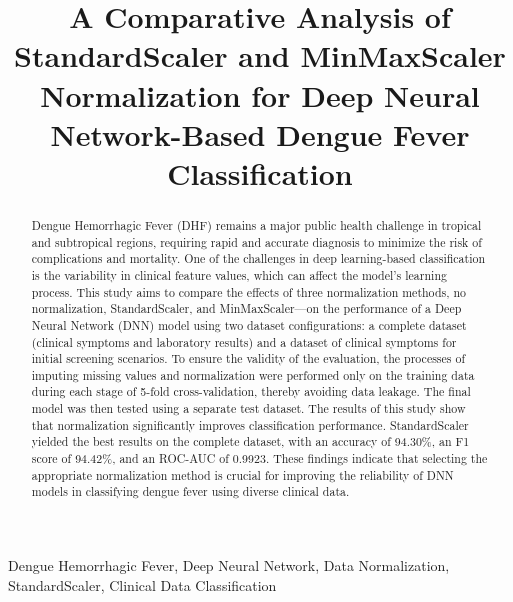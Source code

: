 \documentclass[conference]{IEEEtran}
\begin{document}
\title{
A Comparative Analysis of StandardScaler and MinMaxScaler Normalization for Deep Neural Network-Based Dengue Fever Classification
}

\author{
}

\maketitle

\begin{abstract}
Dengue Hemorrhagic Fever (DHF) remains a major public health challenge in tropical and subtropical regions, requiring rapid and accurate diagnosis to minimize the risk of complications and mortality. One of the challenges in deep learning-based classification is the variability in clinical feature values, which can affect the model's learning process. This study aims to compare the effects of three normalization methods, no normalization, StandardScaler, and MinMaxScaler—on the performance of a Deep Neural Network (DNN) model using two dataset configurations: a complete dataset (clinical symptoms and laboratory results) and a dataset of clinical symptoms for initial screening scenarios. To ensure the validity of the evaluation, the processes of imputing missing values and normalization were performed only on the training data during each stage of 5-fold cross-validation, thereby avoiding data leakage. The final model was then tested using a separate test dataset. The results of this study show that normalization significantly improves classification performance. StandardScaler yielded the best results on the complete dataset, with an accuracy of 94.30\%, an F1 score of 94.42\%, and an ROC-AUC of 0.9923. These findings indicate that selecting the appropriate normalization method is crucial for improving the reliability of DNN models in classifying dengue fever using diverse clinical data.
\end{abstract}

\begin{IEEEkeywords}
Dengue Hemorrhagic Fever, Deep Neural Network, Data Normalization, StandardScaler, Clinical Data Classification
\end{IEEEkeywords}
\end{document}
